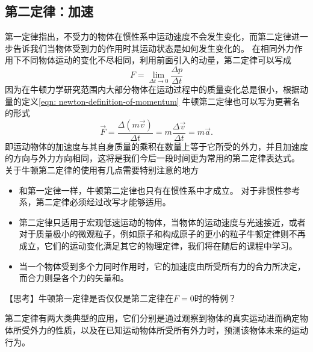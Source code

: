 \subsection{第二定律：加速}
第一定律指出，不受力的物体在惯性系中运动速度不会发生变化，而第二定律进一步告诉我们当物体受到力的作用时其运动状态是如何发生变化的。
在相同外力作用下不同物体运动的变化不尽相同，利用前面引入的动量，第二定律可以写成
\begin{equation}
F = \lim_{ \Delta t\rightarrow 0} \frac{ \Delta p}{ \Delta t}
\end{equation}
因为在牛顿力学研究范围内大部分物体在运动过程中的质量变化总是很小，根据动量的定义\ref{eqn: newton-definition-of-momentum} 牛顿第二定律也可以写为更著名的形式
\begin{equation}
\vec{F} = \frac{ \Delta (m\vec{v})}{ \Delta t} = m \frac{ \Delta\vec{v}}{ \Delta t} = m\vec{a}.
\end{equation}\label{eqn: newton-f=ma}
即运动物体的加速度与其自身质量的乘积在数量上等于它所受的外力，并且加速度的方向与外力方向相同，这将是我们今后一段时间更为常用的第二定律表达式。
关于牛顿第二定律的使用有几点需要特别注意的地方
\begin{itemize}
\item
和第一定律一样，牛顿第二定律也只有在惯性系中才成立。
对于非惯性参考系，第二定律必须经过改写才能够适用。
\item
第二定律只适用于宏观低速运动的物体，当物体的运动速度与光速接近，或者对于质量极小的微观粒子，例如原子和构成原子的更小的粒子牛顿定律则不再成立，它们的运动变化满足其它的物理定律，我们将在随后的课程中学习。
\item
当一个物体受到多个力同时作用时，它的加速度由所受所有力的合力所决定，而合力则是各个力的矢量和。
\end{itemize}

【思考】牛顿第一定律是否仅仅是第二定律在$F=0$时的特例？

第二定律有两大类典型的应用，它们分别是通过观察到物体的真实运动进而确定物体所受外力的性质，以及在已知运动物体所受所有外力时，预测该物体未来的运动行为。

